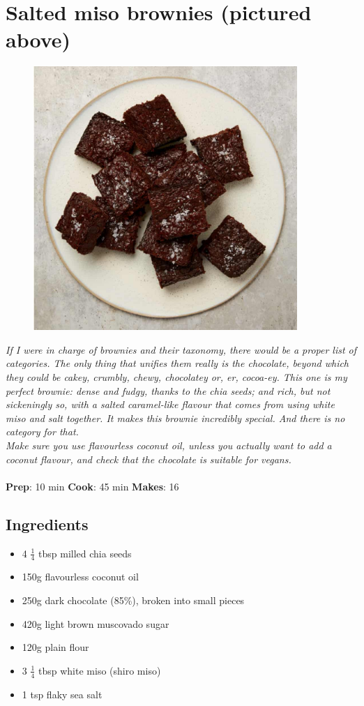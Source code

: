 \documentclass{book}
\begin{document}
\section{Salted miso brownies (pictured above)}
\begin{figure}
\centering\includegraphics[width=10cm,height=10cm,keepaspectratio]{Recipe_Pictures/Salted_miso_brownies_(pictured_above).png}
\end{figure}
\emph{If I were in charge of brownies and their taxonomy, there would be a proper list of categories. The only thing that unifies them really is the chocolate, beyond which they could be cakey, crumbly, chewy, chocolatey or, er, cocoa-ey. This one is my perfect brownie: dense and fudgy, thanks to the chia seeds; and rich, but not sickeningly so, with a salted caramel-like flavour that comes from using white miso and salt together. It makes this brownie incredibly special. And there is no category for that.\\ 
Make sure you use flavourless coconut oil, unless you actually want to add a coconut flavour, and check that the chocolate is suitable for vegans.}\\\\ 
\textbf{Prep}: 10 min
\textbf{Cook}: 45 min
\textbf{Makes}: 16
\subsection*{Ingredients}
\begin{itemize}
\item 4 $\frac{1}{4}$ tbsp milled chia seeds
\item 150g flavourless coconut oil
\item 250g dark chocolate (85\%), broken into small pieces
\item 420g light brown muscovado sugar
\item 120g plain flour
\item 3 $\frac{1}{4}$ tbsp white miso (shiro miso)
\item 1 tsp flaky sea salt
\end{itemize}
\end{document}
